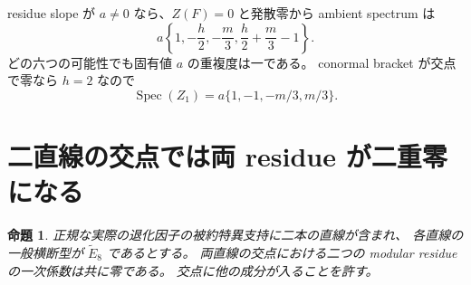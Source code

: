 \documentclass[11pt,a4paper]{ltjsarticle}
\newtheorem{proposition}[theorem]{命題}
\theoremstyle{remark}\newtheorem{remark}[theorem]{注意}
\begin{document}
residue slope が $a\ne0$ なら、$Z(F)=0$ と発散零から ambient spectrum は
\begin{equation}\label{eq:line-spectrum-node}
 a\left\{1,-\frac h2,-\frac m3,\frac h2+\frac m3-1\right\}.
\end{equation}
どの六つの可能性でも固有値 $a$ の重複度は一である。
conormal bracket が交点で零なら $h=2$ なので
\[
 \operatorname{Spec}(Z_1)=a\{1,-1,-m/3,m/3\}.
 \tag{LS2}
\]



\section{二直線の交点では両 residue が二重零になる}

\begin{proposition}\label{prop:two-lines}
正規な実際の退化因子の被約特異支持に二本の直線が含まれ、
各直線の一般横断型が $\widetilde E_8$ であるとする。
両直線の交点における二つの modular residue の一次係数は共に零である。
交点に他の成分が入ることを許す。
\end{proposition}
\end{document}
